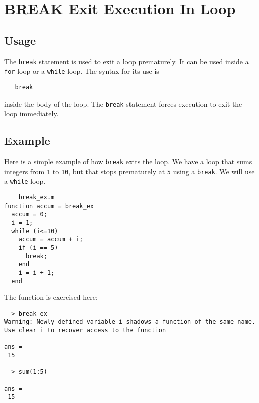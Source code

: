 \section{BREAK Exit Execution In Loop}

\subsection{Usage}

The \verb|break| statement is used to exit a loop prematurely.
It can be used inside a \verb|for| loop or a \verb|while| loop.  The
syntax for its use is
\begin{verbatim}
   break
\end{verbatim}
inside the body of the loop.  The \verb|break| statement forces
execution to exit the loop immediately.
\subsection{Example}

Here is a simple example of how \verb|break| exits the loop.
We have a loop that sums integers from \verb|1| to \verb|10|, but
that stops prematurely at \verb|5| using a \verb|break|.  We will
use a \verb|while| loop.
\begin{verbatim}
    break_ex.m
function accum = break_ex
  accum = 0;
  i = 1;
  while (i<=10) 
    accum = accum + i;
    if (i == 5)
      break;
    end
    i = i + 1;
  end
\end{verbatim}
The function is exercised here:
\begin{verbatim}
--> break_ex
Warning: Newly defined variable i shadows a function of the same name.  Use clear i to recover access to the function

ans = 
 15 

--> sum(1:5)

ans = 
 15 
\end{verbatim}
